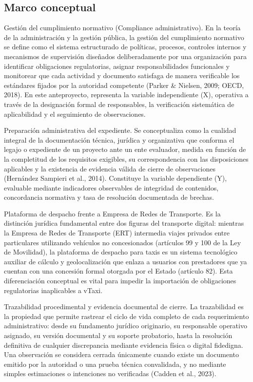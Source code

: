 {\subsection{Marco conceptual}
Gestión del cumplimiento normativo (Compliance administrativo). En la teoría de la administración y la gestión pública, la gestión del cumplimiento normativo se define como el sistema estructurado de políticas, procesos, controles internos y mecanismos de supervisión diseñados deliberadamente por una organización para identificar obligaciones regulatorias, asignar responsabilidades funcionales y monitorear que cada actividad y documento satisfaga de manera verificable los estándares fijados por la autoridad competente (Parker \& Nielsen, 2009; OECD, 2018). En este anteproyecto, representa la variable independiente (X), operativa a través de la designación formal de responsables, la verificación sistemática de aplicabilidad y el seguimiento de observaciones.


Preparación administrativa del expediente. Se conceptualiza como la cualidad integral de la documentación técnica, jurídica y organizativa que conforma el legajo o expediente de un proyecto ante un ente evaluador, medida en función de la completitud de los requisitos exigibles, su correspondencia con las disposiciones aplicables y la existencia de evidencia válida de cierre de observaciones (Hernández Sampieri et al., 2014). Constituye la variable dependiente (Y), evaluable mediante indicadores observables de integridad de contenidos, concordancia normativa y tasa de resolución documentada de brechas.


Plataforma de despacho frente a Empresa de Redes de Transporte. Es la distinción jurídica fundamental entre dos figuras del transporte digital: mientras la Empresa de Redes de Transporte (ERT) intermedia viajes privados entre particulares utilizando vehículos no concesionados (artículos 99 y 100 de la Ley de Movilidad), la plataforma de despacho para taxis es un sistema tecnológico auxiliar de cálculo y geolocalización que enlaza a usuarios con prestadores que ya cuentan con una concesión formal otorgada por el Estado (artículo 82). Esta diferenciación conceptual es vital para impedir la importación de obligaciones regulatorias inaplicables a vTaxi.


Trazabilidad procedimental y evidencia documental de cierre. La trazabilidad es la propiedad que permite rastrear el ciclo de vida completo de cada requerimiento administrativo: desde su fundamento jurídico originario, su responsable operativo asignado, su versión documental y su soporte probatorio, hasta la resolución definitiva de cualquier discrepancia mediante evidencia física o digital fidedigna. Una observación se considera cerrada únicamente cuando existe un documento emitido por la autoridad o una prueba técnica convalidada, y no mediante simples estimaciones o intenciones no verificadas (Cadden et al., 2023).


}
